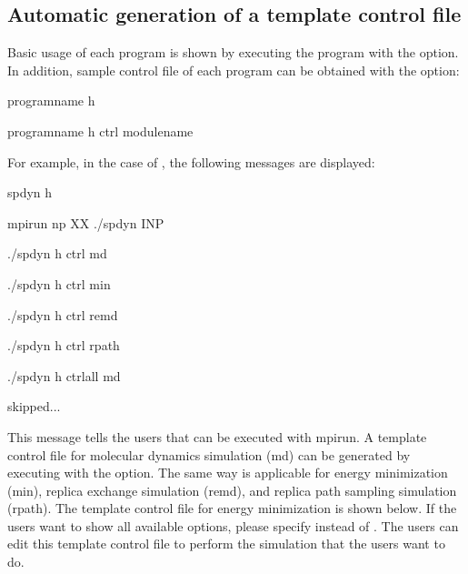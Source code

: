 \documentclass[a4paper,11pt,oneside,english]{sphinxmanual}
\begin{document}
\subsection{Automatic generation of a template control file}
\label{\detokenize{01_Getting_Started:automatic-generation-of-a-template-control-file}}
Basic usage of each program is shown by executing the program with the  option. In addition, sample control file of each program can be obtained with the  option:

\begin{sphinxVerbatim}[commandchars=\\\{\}]
\PYGZdl{} \PYG{o}{[}program\PYGZus{}name\PYG{o}{]} \PYGZhy{}h

\PYGZdl{} \PYG{o}{[}program\PYGZus{}name\PYG{o}{]} \PYGZhy{}h ctrl \PYG{o}{[}module\PYGZus{}name\PYG{o}{]}
\end{sphinxVerbatim}

For example, in the case of , the following messages are displayed:

\begin{sphinxVerbatim}[commandchars=\\\{\}]
\PYGZdl{} spdyn \PYGZhy{}h

  \PYGZpc{} mpirun \PYGZhy{}np XX ./spdyn INP

  \PYGZpc{} ./spdyn \PYGZhy{}h ctrl md

  \PYGZpc{} ./spdyn \PYGZhy{}h ctrl min

  \PYGZpc{} ./spdyn \PYGZhy{}h ctrl remd

  \PYGZpc{} ./spdyn \PYGZhy{}h ctrl rpath

  \PYGZpc{} ./spdyn \PYGZhy{}h ctrl\PYGZus{}all md

skipped...
\end{sphinxVerbatim}

This message tells the users that  can be executed with mpirun.
A template control file for molecular dynamics simulation (md) can be
generated by executing  with the  option.
The same way is applicable for energy minimization (min),
replica exchange simulation (remd), and replica path sampling simulation (rpath).
The template control file for energy minimization is shown below.
If the users want to show all available options, please specify  instead of .
The users can edit this template control file to perform the simulation that the users want to do.
\end{document}
